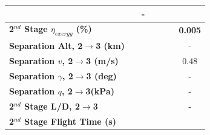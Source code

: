 \begin{table}[ht]
\begin{tabular}{l c c c c c c}
		& \firstsecondSeparationgammaTThreeOneHundredTenNoReturn
		& -
		\\
		\hline 
		\textbf{2$^{nd}$ Stage $\eta_{exergy}$ (\%)}
		& \textbf{\secondExergyEffTThreeNinetyNoReturn}
		& \textbf{\secondExergyEffTThreeNinetyFiveNoReturn}
		& \textbf{\secondExergyEffTThreeStandardNoReturn}
		& \textbf{\secondExergyEffTThreeOneHundredFiveNoReturn}
		& \textbf{\secondExergyEffTThreeOneHundredTenNoReturn}
		& \textbf{0.005}
		\\
		\textbf{Separation Alt, 2$\rightarrow$3 (km)}
		& \secondthirdSeparationAltTThreeNinetyNoReturn
		& \secondthirdSeparationAltTThreeNinetyFiveNoReturn
		& \secondthirdSeparationAltTThreeStandardNoReturn
		& \secondthirdSeparationAltTThreeOneHundredFiveNoReturn
		& \secondthirdSeparationAltTThreeOneHundredTenNoReturn
		& -
		\\
		\textbf{Separation $v$, 2$\rightarrow$3 (m/s)}
		& \secondthirdSeparationvTThreeNinetyNoReturn
		& \secondthirdSeparationvTThreeNinetyFiveNoReturn
		& \secondthirdSeparationvTThreeStandardNoReturn
		& \secondthirdSeparationvTThreeOneHundredFiveNoReturn
		& \secondthirdSeparationvTThreeOneHundredTenNoReturn
		&0.48
		\\
		\textbf{Separation $\gamma$, 2$\rightarrow$3 (deg)}
		& \secondthirdSeparationgammaTThreeNinetyNoReturn
		& \secondthirdSeparationgammaTThreeNinetyFiveNoReturn
		& \secondthirdSeparationgammaTThreeStandardNoReturn
		& \secondthirdSeparationgammaTThreeOneHundredFiveNoReturn
		& \secondthirdSeparationgammaTThreeOneHundredTenNoReturn
		& -
		\\
		\textbf{Separation $q$, 2$\rightarrow$3(kPa)}
		& \secondthirdSeparationqTThreeNinetyNoReturn
		& \secondthirdSeparationqTThreeNinetyFiveNoReturn
		& \secondthirdSeparationqTThreeStandardNoReturn
		& \secondthirdSeparationqTThreeOneHundredFiveNoReturn
		& \secondthirdSeparationqTThreeOneHundredTenNoReturn
		& -
		\\
		\textbf{2$^{nd}$ Stage L/D, 2$\rightarrow$3}
		& \secondthirdSeparationLDTThreeNinetyNoReturn
		& \secondthirdSeparationLDTThreeNinetyFiveNoReturn
		& \secondthirdSeparationLDTThreeStandardNoReturn
		& \secondthirdSeparationLDTThreeOneHundredFiveNoReturn
		& \secondthirdSeparationLDTThreeOneHundredTenNoReturn
		& -
		\\
		\textbf{2$^{nd}$ Stage Flight Time (s)}
		& \secondFlightTimeTThreeNinetyNoReturn
		& \secondFlightTimeTThreeNinetyFiveNoReturn
		& \secondFlightTimeTThreeStandardNoReturn
		& \secondFlightTimeTThreeOneHundredFiveNoReturn
		& \secondFlightTimeTThreeOneHundredTenNoReturn

\end{tabular}
\end{table}
